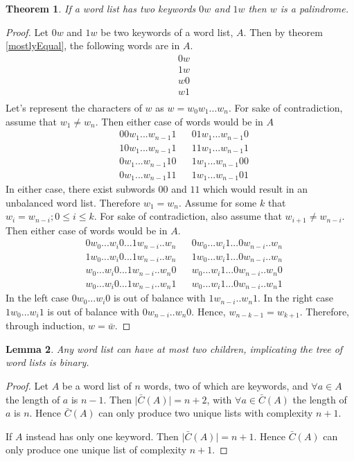 \documentclass{article}
\newtheorem{theorem}{Theorem}[section]
\newtheorem{lemma}[theorem]{Lemma}
\begin{document}
\begin{theorem}
    If a word list has two keywords $0w$ and $1w$ then $w$ is a palindrome.
\end{theorem}
\begin{proof}
    Let $0w$ and $1w$ be two keywords of a word list, $A$. Then by theorem \ref{mostlyEqual}, the following words are in $A$.
    \begin{align*}
        &0w \\
        &1w \\
        &w0 \\
        &w1 \\
    \end{align*}
    Let's represent the characters of $w$ as $w = w_0w_1...w_n$. For sake of contradiction, assume that $w_1 \neq w_n$. Then either case of words would be in $A$
    \begin{align*}
        &00w_1...w_{n-1}1 &         &01w_1...w_{n-1}0 \\
        &10w_1...w_{n-1}1 &         &11w_1...w_{n-1}1 \\
        &0w_1...w_{n-1}10 &         &1w_1...w_{n-1}00 \\
        &0w_1...w_{n-1}11 &         &1w_1...w_{n-1}01 
    \end{align*}
    In either case, there exist subwords $00$ and $11$ which would result in an unbalanced word list. Therefore $w_1 = w_n$.
    Assume for some $k$ that $w_i = w_{n - i}; 0 \leq i \leq k$. For sake of contradiction, also assume that $w_{i + 1} \neq w_{n - i}$. Then either case of words would be in $A$.
    \begin{align*}
        &0w_0...w_i0...1w_{n-i}..w_{n} &    &0w_0...w_i1...0w_{n-i}..w_{n} \\
        &1w_0...w_i0...1w_{n-i}..w_{n} &    &1w_0...w_i1...0w_{n-i}..w_{n} \\
        &w_0...w_i0...1w_{n-i}..w_{n}0 &    &w_0...w_i1...0w_{n-i}..w_{n}0 \\
        &w_0...w_i0...1w_{n-i}..w_{n}1 &    &w_0...w_i1...0w_{n-i}..w_{n}1 
    \end{align*}
    In the left case $0w_0...w_i0$ is out of balance with $1w_{n-i}..w_{n}1$. In the right case $1w_0...w_i1$ is out of balance with $0w_{n-i}..w_{n}0$. Hence, $w_{n-k-1} = w_{k+1}$. Therefore, through induction, $w = \bar w$.
\end{proof}



\newpage
\begin{lemma}
Any word list can have at most two children, implicating the tree of word lists is binary.
\end{lemma}
\begin{proof}
    Let $A$ be a word list of $n$ words, two of which are keywords, and $\forall a \in A$ the length of $a$ is $n-1$. Then $\Big | \bar C(A) \Big | =  n + 2$, with  $\forall a \in \bar C (A)$ the length of $a$ is $n$. Hence $\bar C (A)$ can only produce two unique lists with complexity $n + 1$.

    If $A$ instead has only one keyword. Then $\Big | \bar C(A) \Big | = n + 1$. Hence $\bar C (A)$ can only produce one unique list of complexity $n + 1$.
\end{proof}
\end{document}
